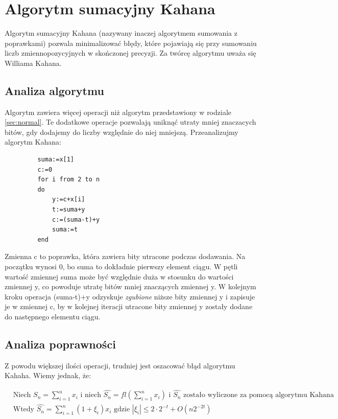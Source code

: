 \documentclass[11pt]{article}
\begin{document}
\section{Algorytm sumacyjny Kahana}
\label{sec:kahan}
Algorytm sumacyjny Kahana (nazywany inaczej algorytmem sumowania z poprawkami) pozwala minimalizować błędy, które pojawiają się przy sumowaniu liczb zmiennopozycyjnych w skończonej precyzji. Za twórcę algorytmu uważa się Williama Kahana.
\subsection{Analiza algorytmu}
Algorytm zawiera więcej operacji niż algorytm przedstawiony w rodziale \ref{sec:normal}. Te dodatkowe operacje pozwalają uniknąć utraty mniej znaczacych bitów, gdy dodajemy do liczby względnie do niej mniejszą. Przeanalizujmy algorytm Kahana:
\begin{verbatim}
         suma:=x[1]   
         c:=0
         for i from 2 to n
         do
             y:=c+x[i] 
             t:=suma+y 
             c:=(suma-t)+y
             suma:=t
         end
\end{verbatim}
Zmienna c to poprawka, która zawiera bity utracone podczas dodawania. Na początku wynosi 0, bo suma to dokładnie pierwszy element ciągu. W pętli wartość zmiennej suma może być względnie duża w stosunku do wartości zmiennej y, co powoduje utratę bitów mniej znaczących zmiennej y. W kolejnym kroku operacja (suma-t)+y odzyskuje \textit{zgubione} niższe bity zmiennej y i zapisuje je w zmiennej c, by w kolejnej iteracji utracone bity zmiennej y zostały dodane do następnego elementu ciągu.

\subsection{Analiza poprawności}
Z powodu większej ilości operacji, trudniej jest oszacować błąd algorytmu Kahaha. Wiemy jednak, że:

\begin{equation}
\begin{split}
	&\text{Niech } S_{n} = \sum_{i=1}^{n}x_i \text{ i niech } \hat{S_{n}} = fl(\sum_{i=1}^{n}x_i) \text{ i $\hat{S_{n}}$ zostało wyliczone za pomocą algorytmu Kahana}\\ 
	&\text{Wtedy } \hat{S_{n}} = \sum_{i=1}^{n}(1 + \xi_i)x_i \text{ gdzie } |\xi_i| \leq 2 \cdot 2^{-t} + O(n2^{-2t})\\
\end{split}
\end{equation}
\end{document}
